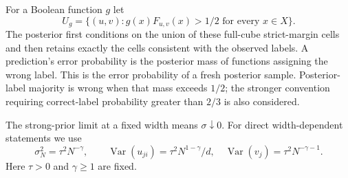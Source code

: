 \documentclass[11pt]{article}
\begin{document}
For a Boolean function $g$ let
\[
 U_g=\{(u,v):g(x)F_{u,v}(x)>1/2\text{ for every }x\in X\}.
\]
The posterior first conditions on the union of these full-cube
strict-margin cells and then retains exactly the cells consistent with
the observed labels. A prediction's error probability is the posterior
mass of functions assigning the wrong label. This is the error
probability of a fresh posterior sample. Posterior-label majority is
wrong when that mass exceeds $1/2$; the stronger convention requiring
correct-label probability greater than $2/3$ is also considered.

The strong-prior limit at a fixed width means $\sigma\downarrow0$.
For direct width-dependent statements we use
\begin{equation}\label{eq:scaling}
 \sigma_N^2=\tau^2N^{-\gamma},\qquad
 \operatorname{Var}(u_{ji})=\tau^2N^{1-\gamma}/d,
 \quad \operatorname{Var}(v_j)=\tau^2N^{-\gamma-1}.
\end{equation}
Here $\tau>0$ and $\gamma\ge1$ are fixed.
\end{document}
